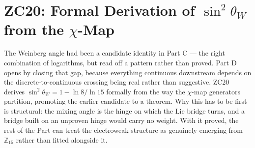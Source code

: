 \documentclass[12pt, a4paper]{article}
\begin{document}
\section{ZC20: Formal Derivation of $\sin^2\theta_W$ from the $\chi$-Map}
\label{sec:zc20-weinberg-formal}

The Weinberg angle had been a candidate identity in Part C --- the right
combination of logarithms, but read off a pattern rather than proved. Part D
opens by closing that gap, because everything continuous downstream depends on
the discrete-to-continuous crossing being real rather than suggestive. ZC20
derives $\sin^2\theta_W = 1 - \ln 8/\ln 15$ formally from the way the $\chi$-map
generators partition, promoting the earlier candidate to a theorem. Why this has
to be first is structural: the mixing angle is the hinge on which the Lie bridge
turns, and a bridge built on an unproven hinge would carry no weight. With it
proved, the rest of the Part can treat the electroweak structure as genuinely
emerging from $\mathbb{Z}_{15}$ rather than fitted alongside it.

\end{document}
